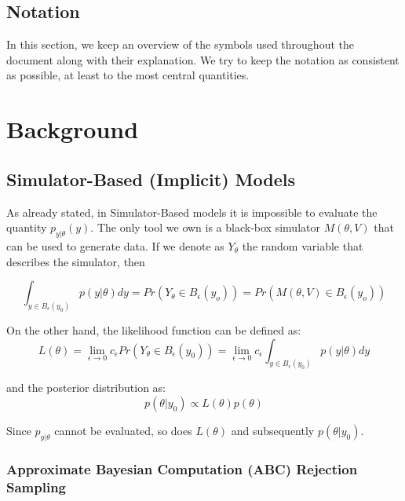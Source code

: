 \documentclass[11pt,twoside]{article}
\numberwithin{Theorem}{section}
\numberwithin{Definition}{section}
\numberwithin{Lemma}{section}
\numberwithin{Algorithm}{section}
\numberwithin{equation}{section}
\begin{document}
\subsection{Notation}

In this section, we keep an overview of the symbols used throughout the document along with their explanation. We try to keep the notation as consistent as possible, at least to the most central quantities.

\clearpage

\section{Background}
\label{sec:background}

\subsection{Simulator-Based (Implicit) Models}

As already stated, in Simulator-Based models it is impossible to evaluate the quantity $p_{y|\theta}(y)$. The only tool we own is a black-box simulator $M(\theta, V)$ that can be used to generate data. If we denote as $Y_\theta$ the random variable that describes the simulator, then

\begin{equation}
  \int_{y \in B_\epsilon(y_0)} p(y|\theta)dy =  Pr(Y_\theta \in B_\epsilon(y_o)) = Pr(M(\theta, V) \in B_\epsilon(y_o))
  \end{equation}

  On the other hand, the likelihood function can be defined as:
\begin{equation}
  L(\theta) =  \lim_{\epsilon \to 0} c_\epsilon Pr(Y_\theta \in B_\epsilon(y_0)) = \lim_{\epsilon \to 0} c_\epsilon \int_{y \in B_\epsilon(y_0)} p(y|\theta)dy
\end{equation}

and the posterior distribution as:
\begin{equation}
p(\theta|y_0) \propto L(\theta)p(\theta)
\end{equation}

Since $p_{y|\theta}$ cannot be evaluated, so does $L(\theta)$ and subsequently $p(\theta|y_0)$.

\subsubsection{Approximate Bayesian Computation (ABC) Rejection Sampling}
\end{document}
